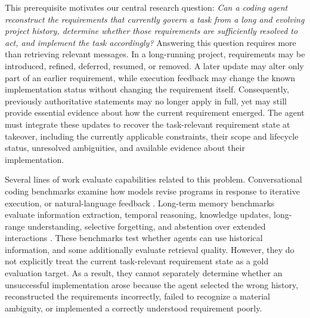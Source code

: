 \documentclass{article} %
\begin{document}
This prerequisite motivates our central research question: \emph{Can a coding agent reconstruct the requirements that currently govern a task from a long and evolving project history, determine whether those requirements are sufficiently resolved to act, and implement the task accordingly?} Answering this question requires more than retrieving relevant messages. In a long-running project, requirements may be introduced, refined, deferred, resumed, or removed. A later update may alter only part of an earlier requirement, while execution feedback may change the known implementation status without changing the requirement itself. Consequently, previously authoritative statements may no longer apply in full, yet may still provide essential evidence about how the current requirement emerged. The agent must integrate these updates to recover the task-relevant requirement state at takeover, including the currently applicable constraints, their scope and lifecycle status, unresolved ambiguities, and available evidence about their implementation.

Several lines of work evaluate capabilities related to this problem. Conversational coding benchmarks examine how models revise programs in response to iterative execution, or natural-language feedback \citep{han2025convcodeworld}. Long-term memory benchmarks evaluate information extraction, temporal reasoning, knowledge updates, long-range understanding, selective forgetting, and abstention over extended interactions \citep{wu2025longmemeval,maharana2024locomo,hu2025memoryagentbench}. These benchmarks test whether agents can use historical information, and some additionally evaluate retrieval quality. However, they do not explicitly treat the current task-relevant requirement state as a gold evaluation target. As a result, they cannot separately determine whether an unsuccessful implementation arose because the agent selected the wrong history, reconstructed the requirements incorrectly, failed to recognize a material ambiguity, or implemented a correctly understood requirement poorly.

\end{document}
